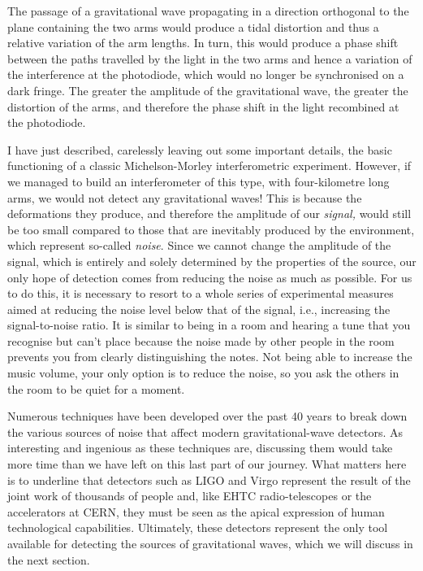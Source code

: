 The passage of a gravitational wave propagating in a direction orthogonal to the plane
containing the two arms would produce a tidal distortion and thus a relative variation
of the arm lengths. In turn, this would produce a phase shift between the paths
travelled by the light in the two arms and hence a variation of the
interference at the photodiode, which would no longer be synchronised
on a dark fringe. The greater the amplitude of the gravitational wave, the greater the
distortion of the arms, and therefore the phase shift in the light recombined at the
photodiode.

I have just described, carelessly leaving out some important details, the basic
functioning of a classic Michelson-Morley interferometric experiment. However, if we
managed to build an interferometer of this type, with four-kilometre long arms, we would
not detect any gravitational waves! This is because the deformations they produce, and
therefore the amplitude of our \emph{signal,} would still be too small compared to those
that are inevitably produced by the environment, which represent so-called
\emph{noise}. Since we cannot change the amplitude of the signal,
which is entirely and solely determined by the properties of the source, our only hope
of detection comes from reducing the noise as much as possible. For us to do this, it is
necessary to resort to a whole series of experimental measures aimed at reducing the
noise level below that of the signal, i.e., increasing the
signal-to-noise ratio. It is similar to being in a
room and hearing a tune that you recognise but can't place because the noise made by
other people in the room prevents you from clearly distinguishing the notes. Not being
able to increase the music volume, your only option is to reduce the noise, so you ask
the others in the room to be quiet for a moment.

Numerous techniques have been developed over the past 40 years to break down the various
sources of noise that affect modern gravitational-wave detectors. As interesting and
ingenious as these techniques are, discussing them would take more time than we have
left on this last part of our journey. What matters here is to underline that detectors
such as LIGO and Virgo represent the result of the joint work of thousands of people
and, like EHTC radio-telescopes or the accelerators at
CERN, they must be seen as the apical expression of human
technological capabilities. Ultimately, these detectors represent the only tool
available for detecting the sources of gravitational waves, which we will discuss in the
next section.

